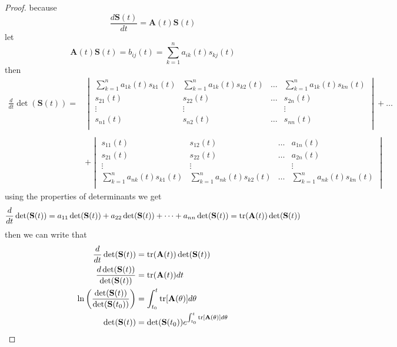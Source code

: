 \documentclass[]{article}
\begin{document}
\begin{proof}[Proof]
    because
    \[
        \frac{d\mathbf{S}(t)}{dt} = \mathbf{A}(t)\mathbf{S}(t)
    \]
    let
    \[
        \mathbf{A}(t)\mathbf{S}(t) = b_{ij}(t) = \sum_{k=1}^{n} a_{ik}(t)s_{kj}(t)
    \]
    then
    \begin{align*}
        \frac{d}{dt} \det(\mathbf{S}(t))
        = &
        \begin{vmatrix}
            \sum_{k=1}^{n} a_{1k}(t)s_{k1}(t) & \sum_{k=1}^{n} a_{1k}(t)s_{k2}(t) & \dots & \sum_{k=1}^{n} a_{1k}(t)s_{kn}(t) \\
            s_{21}(t)                         & s_{22}(t)                         & \dots & s_{2n}(t)                         \\
            \vdots                            & \vdots                            &       & \vdots                            \\
            s_{n1}(t)                         & s_{n2}(t)                         & \dots & s_{nn}(t)                         \\
        \end{vmatrix}
        +
        \dots
        \\
        \\
          & +
        \begin{vmatrix}
            s_{11}(t)                         & s_{12}(t)                         & \dots & a_{1n}(t)                         \\
            s_{21}(t)                         & s_{22}(t)                         & \dots & a_{2n}(t)                         \\
            \vdots                            & \vdots                            &       & \vdots                            \\
            \sum_{k=1}^{n} a_{nk}(t)s_{k1}(t) & \sum_{k=1}^{n} a_{nk}(t)s_{k2}(t) & \dots & \sum_{k=1}^{n} a_{nk}(t)s_{kn}(t) \\
        \end{vmatrix}
    \end{align*}
    using the properties of determinants we get
    \[
        \frac{d}{dt} \det(\mathbf{S}(t)) = a_{11}\det(\mathbf{S}(t)) + a_{22}\det(\mathbf{S}(t)) +\dots+a_{nn}\det(\mathbf{S}(t)) = \trace(\mathbf{A}(t))\det(\mathbf{S}(t))
    \]
    then we can write that
    \begin{align*}
        \frac{d}{dt} \det(\mathbf{S}(t))                                     & = \trace(\mathbf{A}(t))\det(\mathbf{S}(t))
        \\
        \frac{d \det(\mathbf{S}(t))}{\det(\mathbf{S}(t))}                    & = \trace(\mathbf{A}(t)) dt
        \\
        \ln \left( \frac{\det(\mathbf{S}(t))}{\det(\mathbf{S}(t_0))} \right) & = \int_{t_0}^{t}\trace[\mathbf{A}(\theta)]d\theta
        \\
        \det(\mathbf{S}(t))                                                  & = \det(\mathbf{S}(t_0))e^{\int_{t_0}^{t}\trace[\mathbf{A}(\theta)]d\theta}
    \end{align*}
\end{proof}
\end{document}
